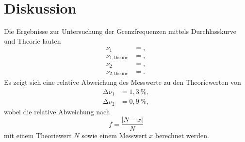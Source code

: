 \section{Diskussion}
\label{sec:Diskussion}

Die Ergebnisse zur Untersuchung der Grenzfrequenzen mittels Durchlasskurve und Theorie lauten
\begin{align*}
  \nu_{1} &= , \\
  \nu_{1, \text{theorie}} &= , \\
  \nu_{2} &= , \\
  \nu_{2, \text{theorie}} &= .
\end{align*}
Es zeigt sich eine relative Abweichung des Messwerte zu den Theoriewerten von
\begin{align*}
  \increment\nu_{1} &= 1,3\:\%, \\
  \increment\nu_{2} &= 0,9\:\%,
\end{align*}
wobei die relative Abweichung nach
\begin{equation}
f = \frac{\lvert N - x \rvert }{N}
\label{eqn:rel_err}
\end{equation}
mit einem Theoriewert $N$ sowie einem Messwert $x$ berechnet werden.\\

